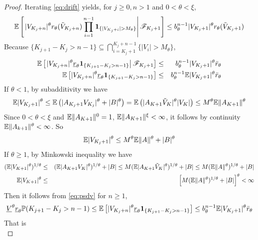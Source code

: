 \begin{proof}
  Iterating \eqref{eq:drift} yields, for $j \geq 0, n > 1$ and $0 < \theta < \xi$,
  \[
  \mathbb{E} \left[
    \left.
    |V_{K_j + n}|^\theta r_{\theta}(\tilde V_{K_j + n})
    \prod_{i=1}^{n-1}\mathbf{1}_{\{|V_{K_j + i}| > M_{\theta}\}}
    \right| \mathscr F_{K_j + 1}
    \right]
  \leq b_{\theta}^{n-1} |V_{K_j + 1}|^\theta r_{\theta}(\tilde V_{K_j+1})
  \]
  Because
  $\{K_{j+1} - K_j > n - 1\} \subseteq \bigcap_{i=K_j + 1}^{K_j + n-1}\{|V_i| > M_{\theta}\}$,
  \begin{eqnarray}
    \mathbb{E} \left[\left.
      |V_{K_j + n}|^\theta \underline r_{\theta}
      \mathbf{1}_{\{K_{j+1} - K_j > n - 1\}}
      \right| \mathscr F_{K_j + 1}
      \right]
    &\leq&
    b_{\theta}^{n-1} |V_{K_j + 1}|^\theta \bar r_{\theta}
    \nonumber \\
    \mathbb{E} \left[
      |V_{K_j + n}|^\theta \underline r_{\theta}
      \mathbf{1}_{\{K_{j+1} - K_j > n - 1\}}
      \right]
    &\leq&
    b_{\theta}^{n-1} \mathbb{E} |V_{K_j + 1}|^\theta \bar
    r_{\theta}
    \label{eq:psdv}
  \end{eqnarray}
  If $\theta < 1$, by subadditivity we have
  \begin{eqnarray*}
    \mathbb{E} |V_{K_j + 1}|^\theta
    \leq
    \mathbb{E} \left(
    |A_{K_j + 1} V_{K_j}|^\theta + |B|^\theta
    \right)
    =
    \mathbb{E} \left(
    |A_{K+1} \tilde V_{K}|^\theta |V_K|
    \right)
    \leq
    M^\theta \mathbb{E} \|A_{K+1}\|^\theta
  \end{eqnarray*}
  Since $0 < \theta < \xi$ and $\mathbb{E} \|A_{K+1} \|^0 = 1$, $\mathbb{E} \|A_{K+1} \|^\xi < \infty$,
  it follows by continuity $\mathbb{E} \|A_{k+1}\|^\theta < \infty$. So
  \[
  \mathbb{E} |V_{K_j + 1}|^\theta \leq M^\theta \mathbb{E} \|A\|^\theta + |B|^\theta
  \]
  If $\theta \geq 1$, by Minkowski inequality we have
  \begin{eqnarray*}
    (\mathbb{E} |V_{K+1}|^\theta)^{1/\theta}
    &\leq&
    (\mathbb{E} |A_{K+1} V_K|^\theta)^{1/\theta} + |B|
    \leq
    M (\mathbb{E} |A_{K+1} \tilde V_{K}|^\theta)^{1/\theta} + |B|
    \leq
    M (\mathbb{E} \|A\|^\theta)^{1/\theta} + |B| \\
    \mathbb{E} |V_{K+1}|^\theta
    &\leq&
    \left[
      M (\mathbb{E} \|A\|^\theta)^{1/\theta} + |B|      
    \right]^\theta < \infty
  \end{eqnarray*}
  Then it follows from \eqref{eq:psdv} for $n \geq 1$,
  \[
  \underline V^\theta \underline r_\theta
  \mathbb{P}(K_{j+1} - K_j > n - 1)
  \leq
  \mathbb{E} \left[
    |V_{K_j + n}|^\theta \underline r_{\theta}
    \mathbf{1}_{\{K_{j+1} - K_j > n - 1\}}
    \right]
  \leq
  b_{\theta}^{n-1} \mathbb{E} |V_{K_j + 1}|^\theta \bar
  r_{\theta}
  \]
  That is
  \begin{equation}

\end{equation}
\end{proof}
